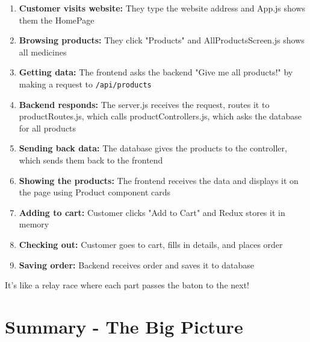 \documentclass[12pt]{article}
\begin{document}
\begin{enumerate}
    \item \textbf{Customer visits website:} They type the website address and App.js shows them the HomePage
    
    \item \textbf{Browsing products:} They click "Products" and AllProductsScreen.js shows all medicines
    
    \item \textbf{Getting data:} The frontend asks the backend "Give me all products!" by making a request to \texttt{/api/products}
    
    \item \textbf{Backend responds:} The server.js receives the request, routes it to productRoutes.js, which calls productControllers.js, which asks the database for all products
    
    \item \textbf{Sending back data:} The database gives the products to the controller, which sends them back to the frontend
    
    \item \textbf{Showing the products:} The frontend receives the data and displays it on the page using Product component cards
    
    \item \textbf{Adding to cart:} Customer clicks "Add to Cart" and Redux stores it in memory
    
    \item \textbf{Checking out:} Customer goes to cart, fills in details, and places order
    
    \item \textbf{Saving order:} Backend receives order and saves it to database
\end{enumerate}

It's like a relay race where each part passes the baton to the next!

\section{Summary - The Big Picture}
\end{document}
